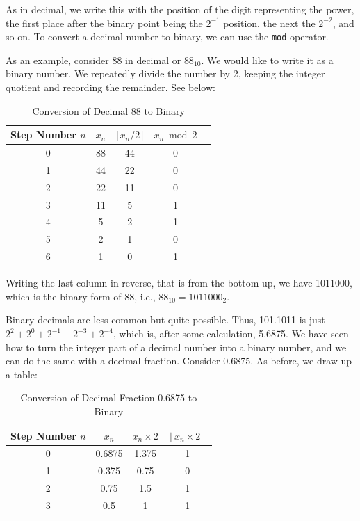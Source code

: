 As in decimal, we write this with the position of the digit representing the power, the first place after the binary point being the $2^{-1}$ position, the next the $2^{-2}$, and so on. To convert a decimal number to binary, we can use the \texttt{mod} operator.

As an example, consider 88 in decimal or $88_{10}$. We would like to write it as a binary number. We repeatedly divide the number by 2, keeping the integer quotient and recording the remainder. See below:

\begin{table}[h!]
\centering
\renewcommand{\arraystretch}{1.4}
\begin{tabular}{|c|c|c|c|c|}
\hline 
Step Number $n$ & $x_n$ & $\lfloor x_n / 2 \rfloor$ & $x_n \bmod 2$ \\ \hline
0 & 88 & 44 & 0 \\ 
1 & 44 & 22 & 0 \\
2 & 22 & 11 & 0 \\
3 & 11 & 5 & 1 \\
4 & 5 & 2 & 1 \\
5 & 2 & 1 & 0 \\
6 & 1 & 0 & 1 \\ \hline
\end{tabular}
\caption{Conversion of Decimal 88 to Binary}
\end{table}

Writing the last column in reverse, that is from the bottom up, we have 1011000, which is the binary form of 88, i.e., $88_{10} = 1011000_2$.

Binary decimals are less common but quite possible. Thus, 101.1011 is just $2^2 + 2^0 + 2^{-1} + 2^{-3} + 2^{-4}$, which is, after some calculation, 5.6875. We have seen how to turn the integer part of a decimal number into a binary number, and we can do the same with a decimal fraction. Consider 0.6875. As before, we draw up a table:

\begin{table}[h!]
\centering
\renewcommand{\arraystretch}{1.4}
\begin{tabular}{|c|c|c|c|}
\hline 
Step Number $n$ & $x_n$ & $x_n \times 2$ & $\left\lfloor x_n \times 2 \right\rfloor$ \\ \hline
0 & 0.6875 & 1.375 & 1 \\ \hline
1 & 0.375 & 0.75 & 0 \\ \hline
2 & 0.75 & 1.5 & 1 \\ \hline
3 & 0.5 & 1 & 1 \\ \hline
\end{tabular}
\caption{Conversion of Decimal Fraction 0.6875 to Binary}
\end{table}


